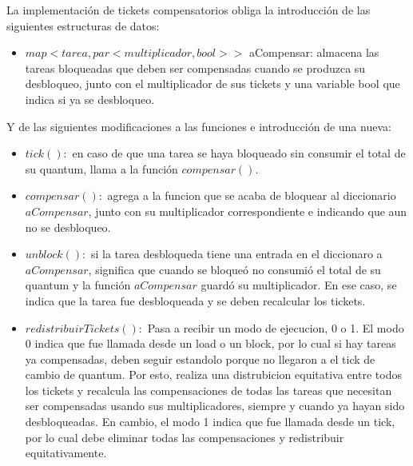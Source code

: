\vspace{2mm}

La implementaci\'on  de tickets compensatorios obliga la introducci\'on de las siguientes estructuras de datos:

\begin{itemize}

\item $map<tarea,par<multiplicador,bool>>$ aCompensar: almacena las tareas bloqueadas que deben ser compensadas cuando se produzca su desbloqueo, junto con el multiplicador de sus tickets y una variable bool que indica si ya se desbloqueo.

\end{itemize}

Y de las siguientes modificaciones a las funciones e introducci\'on de una nueva:

\begin{itemize}

\item $tick(): $ en caso de que una tarea se haya bloqueado sin consumir el total de su quantum, llama a la funci\'on $compensar()$.

\item $compensar():$ agrega a la funcion que se acaba de bloquear al diccionario $aCompensar$, junto con su multiplicador correspondiente e indicando que aun no se desbloqueo.

\item $unblock(): $ si la tarea desbloqueda tiene una entrada en el diccionaro a $aCompensar$, significa que cuando se bloque\'o no consumi\'o el total de su quantum y la funci\'on $aCompensar$ guard\'o su multiplicador. En ese caso, se indica que la tarea fue desbloqueada y se deben recalcular los tickets.

\item $redistribuirTickets(): $ Pasa a recibir un modo de ejecucion, 0 o 1. El modo 0 indica que fue llamada desde un load o un block, por lo cual si hay tareas ya compensadas, deben seguir estandolo porque no llegaron a el tick de cambio de quantum. Por esto, realiza una distrubicion equitativa entre todos los tickets y recalcula las compensaciones de todas las tareas que necesitan ser compensadas usando sus multiplicadores, siempre y cuando ya hayan sido desbloqueadas. En cambio, el modo 1 indica que fue llamada desde un tick, por lo cual debe eliminar todas las compensaciones y redistribuir equitativamente.

\end{itemize}

